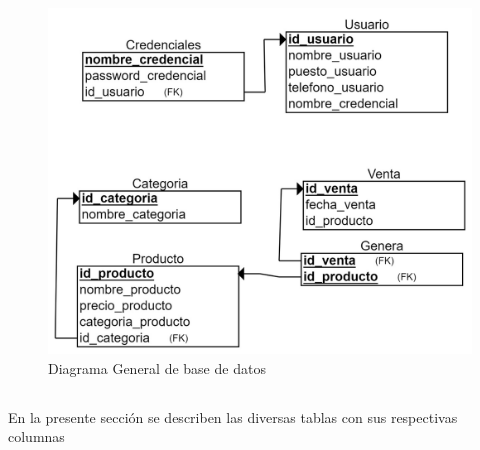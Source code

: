 \documentclass[10pt,a4paper]{article}
\begin{document}
	\begin{figure}[H]
		\includegraphics[scale=.45]{modeloRelacional}
		\centering
		\caption{Diagrama General de base de datos}
		\label{img:modeloRelacional}
	\end{figure} 

\pagebreak

\subsection{
	\textit{
		\color{colorESCOM}{Diccionario de datos}
	}
}

En la presente sección se describen las diversas tablas con sus respectivas columnas
\end{document}
